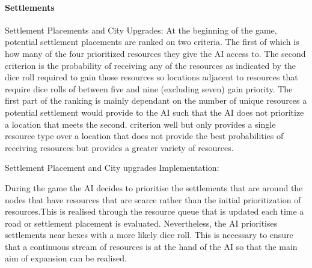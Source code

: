 \documentclass[a4paper,doc]{apa6}
\begin{document}
\paragraph{Settlements}
Settlement Placements and City Upgrades:
	At the beginning of the game, potential settlement placements are ranked on two criteria. The first of which is how many of the four prioritized resources they give the AI access to. The second criterion is the probability of receiving any of the resources as indicated by the dice roll required to gain those resources so locations adjacent to resources that require dice rolls of  between five and nine (excluding seven) gain priority. The first part of the ranking is mainly dependant on the number of unique resources a potential settlement would provide to the AI such that the AI does not prioritize a location that meets the second. criterion well but only provides a single resource type over a location that does not provide the best probabilities of receiving resources but provides a greater variety of resources.

Settlement Placement and City upgrades Implementation:

During the game the AI decides to prioritise the settlements that are around the nodes that have resources that are scarce rather than the initial prioritization of resources.This is realised through the resource queue that is updated each time a road or settlement placement is evaluated. Nevertheless, the AI prioritises settlements near hexes with a more likely dice roll. This is necessary to ensure that a continuous stream of resources is at the hand of the AI so that the main aim of expansion can be realised. 
\end{document}
